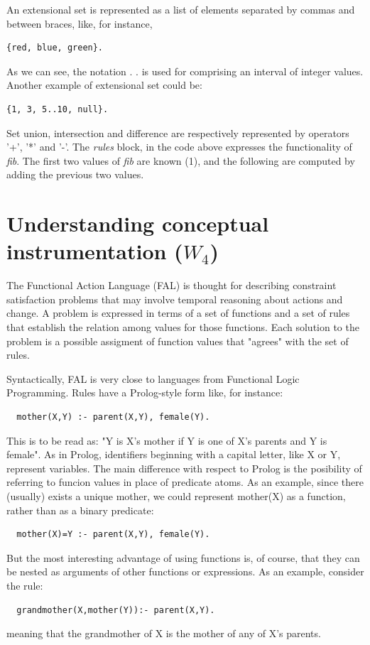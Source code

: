 \documentclass[a4paper,12pt]{report}
\begin{document}
	An extensional set is represented as a list of elements separated by commas and between braces, like, for instance, 
\begin{verbatim}
{red, blue, green}.
\end{verbatim}
As we can see, the notation . . is used for comprising an interval of integer values. Another example of extensional set could be: 
\begin{verbatim}
{1, 3, 5..10, null}.
\end{verbatim}
	Set union, intersection and difference are respectively represented by operators '+', '*' and '-'.
	The \textit{rules} block, in the code above expresses the functionality of \textit{fib}. The first two values of \textit{fib} are known (1), and the following are computed by adding the previous two values.
 

\chapter{Understanding conceptual instrumentation ($W_4$)}
	
	
	The Functional Action Language (FAL) is thought for describing constraint satisfaction problems that may involve temporal reasoning about actions and change.
A problem is expressed in terms of a set of functions and a set of rules that establish the relation among values for those functions.
Each solution to the problem is a possible assigment of function values that "agrees" with the set of rules.

	Syntactically, FAL is very close to languages from Functional Logic Programming. Rules have a Prolog-style form like, for instance:
\begin{verbatim}
  mother(X,Y) :- parent(X,Y), female(Y).
\end{verbatim}

	This is to be read as: "Y is X's mother if Y is one of X's parents and Y is female".
As in Prolog, identifiers beginning with a capital letter, like X or Y, represent variables.
The main difference with respect to Prolog is the posibility of referring to funcion values in place of predicate atoms.
As an example, since there (usually) exists a unique mother, we could represent mother(X) as a function, rather than as a binary predicate:
\begin{verbatim}
  mother(X)=Y :- parent(X,Y), female(Y).
\end{verbatim}

	But the most interesting advantage of using functions is, of course, that they can be nested as arguments of other functions or expressions.
As an example, consider the rule:
\begin{verbatim}
  grandmother(X,mother(Y)):- parent(X,Y).
\end{verbatim}
meaning that the grandmother of X is the mother of any of X's parents.
	
\end{document}
